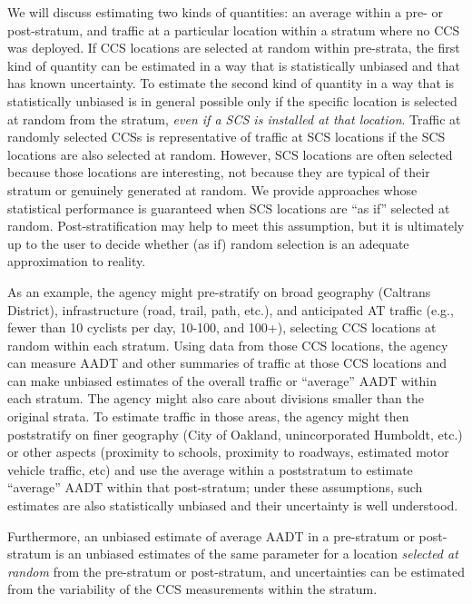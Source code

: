 \documentclass[11pt]{article}
\begin{document}
We will discuss estimating two kinds of quantities: an average within a
pre- or post-stratum, and traffic at a particular location within a
stratum where no CCS was deployed. If CCS locations are selected at
random within pre-strata, the first kind of quantity can be estimated in
a way that is statistically unbiased and that has known uncertainty. To
estimate the second kind of quantity in a way that is statistically
unbiased is in general possible only if the specific location is
selected at random from the stratum, \emph{even if a SCS is installed at
that location}. Traffic at randomly selected CCSs is representative of
traffic at SCS locations if the SCS locations are also selected at
random. However, SCS locations are often selected because those
locations are interesting, not because they are typical of their stratum
or genuinely generated at random. We provide approaches whose
statistical performance is guaranteed when SCS locations are ``as if''
selected at random. Post-stratification may help to meet this
assumption, but it is ultimately up to the user to decide whether (as
if) random selection is an adequate approximation to reality.

As an example, the agency might pre-stratify on broad geography
(Caltrans District), infrastructure (road, trail, path, etc.), and
anticipated AT traffic (e.g., fewer than 10 cyclists per day, 10-100,
and 100+), selecting CCS locations at random within each stratum. Using
data from those CCS locations, the agency can measure AADT and other
summaries of traffic at those CCS locations and can make unbiased
estimates of the overall traffic or ``average'' AADT within each
stratum. The agency might also care about divisions smaller than the
original strata. To estimate traffic in those areas, the agency might
then poststratify on finer geography (City of Oakland, unincorporated
Humboldt, etc.) or other aspects (proximity to schools, proximity to
roadways, estimated motor vehicle traffic, etc) and use the average
within a poststratum to estimate ``average'' AADT within that
post-stratum; under these assumptions, such estimates are also
statistically unbiased and their uncertainty is well understood.

Furthermore, an unbiased estimate of average AADT in a pre-stratum or
post-stratum is an unbiased estimates of the same parameter for a
location \emph{selected at random} from the pre-stratum or post-stratum,
and uncertainties can be estimated from the variability of the CCS
measurements within the stratum.
\end{document}
